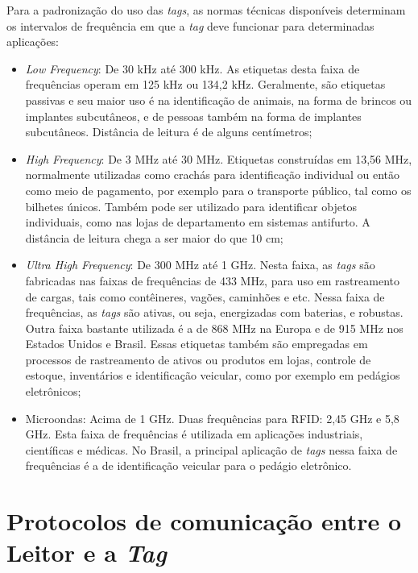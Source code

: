 Para a padronização do uso das \textit{tags}, as normas técnicas disponíveis determinam os intervalos de frequência em que a \textit{tag} deve funcionar para determinadas aplicações:

\begin{itemize}

\item \textit{Low Frequency}: De 30 kHz até 300 kHz. As etiquetas desta faixa de frequências operam em 125 kHz ou 134,2 kHz. Geralmente, são etiquetas passivas e seu maior uso é na identificação de animais, na forma de brincos ou implantes subcutâneos, e de pessoas também na forma de implantes subcutâneos. Distância de leitura é de alguns centímetros;

\item \textit{High Frequency}:  De 3 MHz até 30 MHz. Etiquetas construídas em 13,56 MHz, normalmente utilizadas como crachás para identificação individual ou então como meio de pagamento, por exemplo para o transporte público, tal como os bilhetes únicos. Também pode ser utilizado para identificar objetos individuais, como nas lojas de departamento em sistemas antifurto. A distância de leitura chega a ser maior do que 10 cm;

\item \textit{Ultra High Frequency}: De 300 MHz até 1 GHz. Nesta faixa, as \textit{tags} são fabricadas nas faixas de frequências de 433 MHz, para uso em rastreamento de cargas, tais como contêineres, vagões, caminhões e etc. Nessa faixa de frequências, as \textit{ tags} são ativas, ou seja, energizadas com baterias, e robustas. Outra faixa bastante utilizada é a de 868 MHz na Europa e de 915 MHz nos Estados Unidos e Brasil. Essas etiquetas também são empregadas em processos de rastreamento de ativos ou produtos em lojas, controle de estoque, inventários e identificação veicular, como por exemplo em pedágios eletrônicos;

\item Microondas: Acima de 1 GHz. Duas frequências para RFID: 2,45 GHz e 5,8 GHz. Esta faixa de frequências é utilizada em aplicações industriais, científicas e médicas. No Brasil, a principal aplicação de \textit{tags} nessa faixa de frequências é a de identificação veicular para o pedágio eletrônico. \cite{Puhlmann}

\end{itemize}



\section{Protocolos de comunicação entre o Leitor e a \textit{Tag}}

